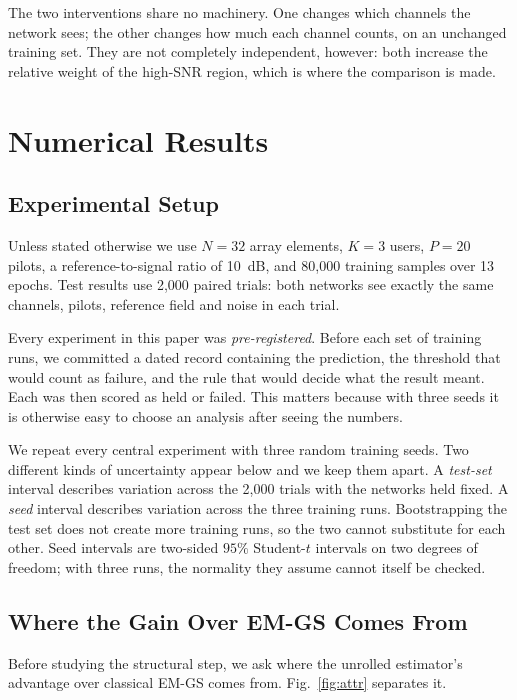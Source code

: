 \documentclass[journal]{IEEEtran}
\begin{document}
The two interventions share no machinery. One changes which channels the
network sees; the other changes how much each channel counts, on an unchanged
training set. They are not completely independent, however: both increase the
relative weight of the high-SNR region, which is where the comparison is made.

\section{Numerical Results}

\subsection{Experimental Setup}

Unless stated otherwise we use $N=32$ array elements, $K=3$ users, $P=20$
pilots, a reference-to-signal ratio of 10~dB, and 80{,}000 training samples
over 13 epochs. Test results use 2{,}000 paired trials: both networks see
exactly the same channels, pilots, reference field and noise in each trial.

Every experiment in this paper was \emph{pre-registered}. Before each set of
training runs, we committed a dated record containing the prediction, the
threshold that would count as failure, and the rule that would decide what the
result meant. Each was then scored as held or failed. This matters because with
three seeds it is otherwise easy to choose an analysis after seeing the
numbers.

We repeat every central experiment with three random training seeds. Two
different kinds of uncertainty appear below and we keep them apart. A
\emph{test-set} interval describes variation across the 2{,}000 trials with the
networks held fixed. A \emph{seed} interval describes variation across the
three training runs. Bootstrapping the test set does not create more training
runs, so the two cannot substitute for each other. Seed intervals are two-sided
$95\%$ Student-$t$ intervals on two degrees of freedom; with three runs, the
normality they assume cannot itself be checked.

\subsection{Where the Gain Over EM-GS Comes From}

Before studying the structural step, we ask where the unrolled estimator's
advantage over classical EM-GS comes from. Fig.~\ref{fig:attr} separates it.
\end{document}
